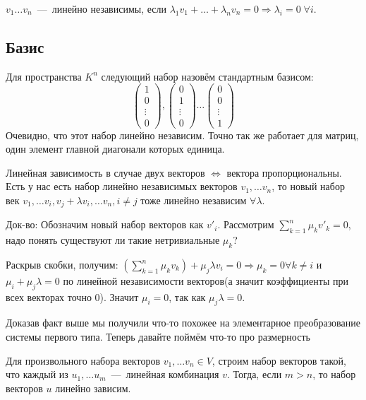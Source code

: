  $v_1\dots v_n$~---~линейно независимы, если
$\lambda_1v_1 + \dots + \lambda_nv_n = 0 \Rightarrow \lambda_i=0\;\forall i $.
\subsection{Базис}
 Для пространства $K^n$ следующий набор назовём стандартным
базисом: $$
\begin{pmatrix}
1\\ 0\\ \vdots \\0
\end{pmatrix},
\begin{pmatrix}
0\\ 1\\ \vdots \\0
\end{pmatrix}
\dots
\begin{pmatrix}
0\\ 0\\ \vdots \\1
\end{pmatrix}$$
Очевидно, что этот набор линейно независим.
Точно так же работает для матриц, один элемент главной диагонали которых единица.


\fact Линейная зависимость в случае двух векторов $\Leftrightarrow$ вектора пропорциональны.
\fact Есть у нас есть набор линейно независимых векторов $v_1,\dots v_n$, то новый набор век
$v_1, \dots v_i, v_j + \lambda v_i, \dots v_n, i\not=j$ тоже линейно независим $\forall \lambda$.

Док-во:
Обозначим новый набор векторов как $v'_i$.
Рассмотрим $\sum_{k = 1}^{n}\mu_k v'_k = 0$, надо понять существуют ли такие нетривиальные $\mu_k$?

Раскрыв скобки, получим:
$(\sum_{k=1}^{n}\mu_kv_k) + \mu_j\lambda v_i = 0 \Rightarrow \mu_k=0\forall k\not=i$ и $\mu_i + \mu_j \lambda = 0$
по линейной независимости векторов(а значит коэффициенты при всех векторах точно 0).
Значит $\mu_i=0$, так как $\mu_j\lambda= 0$.

Доказав факт выше мы получили что-то похожее на элементарное преобразование системы первого типа.
Теперь давайте поймём что-то про размерность

 Для произвольного набора векторов
$v_1,\dots v_n\in V$, строим набор векторов такой, что каждый из
$u_1,\dots u_m$~---~линейная комбинация $v$. 
Тогда, если $m > n$, то набор векторов $u$ линейно зависим.

